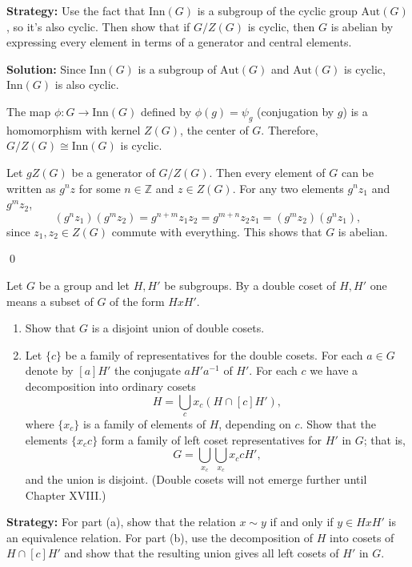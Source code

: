 \noindent\textbf{Strategy:} Use the fact that $\text{Inn}(G)$ is a subgroup of the cyclic group $\text{Aut}(G)$, so it's also cyclic. Then show that if $G/Z(G)$ is cyclic, then $G$ is abelian by expressing every element in terms of a generator and central elements.

\noindent\textbf{Solution:} Since $\text{Inn}(G)$ is a subgroup of $\text{Aut}(G)$ and $\text{Aut}(G)$ is cyclic, $\text{Inn}(G)$ is also cyclic.

The map $\phi: G \to \text{Inn}(G)$ defined by $\phi(g) = \psi_g$ (conjugation by $g$) is a homomorphism with kernel $Z(G)$, the center of $G$. Therefore, $G/Z(G) \cong \text{Inn}(G)$ is cyclic.

Let $gZ(G)$ be a generator of $G/Z(G)$. Then every element of $G$ can be written as $g^nz$ for some $n \in \mathbb{Z}$ and $z \in Z(G)$. For any two elements $g^nz_1$ and $g^mz_2$,
\[(g^nz_1)(g^mz_2) = g^{n+m}z_1z_2 = g^{m+n}z_2z_1 = (g^mz_2)(g^nz_1),\]
since $z_1, z_2 \in Z(G)$ commute with everything. This shows that $G$ is abelian.


\qed
\begin{problembox}
Let $G$ be a group and let $H, H'$ be subgroups. By a double coset of $H, H'$ one means a subset of $G$ of the form $HxH'$.
\begin{enumerate}[label=(\alph*)]
\item Show that $G$ is a disjoint union of double cosets.
\item Let $\{c\}$ be a family of representatives for the double cosets. For each $a \in G$ denote by $[a]H'$ the conjugate $aH'a^{-1}$ of $H'$. For each $c$ we have a decomposition into ordinary cosets
\[H = \bigcup_{c}x_c(H \cap [c]H'),\]
where $\{x_c\}$ is a family of elements of $H$, depending on $c$. Show that the elements $\{x_c c\}$ form a family of left coset representatives for $H'$ in $G$; that is,
\[G = \bigcup_{x_c}\bigcup_{x_c}x_c cH',\]
and the union is disjoint. (Double cosets will not emerge further until Chapter XVIII.)
\end{enumerate}
\end{problembox}

\noindent\textbf{Strategy:} For part (a), show that the relation $x \sim y$ if and only if $y \in HxH'$ is an equivalence relation. For part (b), use the decomposition of $H$ into cosets of $H \cap [c]H'$ and show that the resulting union gives all left cosets of $H'$ in $G$.

